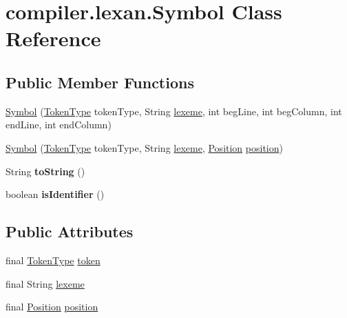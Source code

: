 \hypertarget{classcompiler_1_1lexan_1_1_symbol}{}\section{compiler.\+lexan.\+Symbol Class Reference}
\label{classcompiler_1_1lexan_1_1_symbol}
\subsection*{Public Member Functions}
\begin{DoxyCompactItemize}
\item 
\hyperlink{classcompiler_1_1lexan_1_1_symbol_ae18e45c383fef939abe5bf5959565eec}{Symbol} (\hyperlink{enumcompiler_1_1lexan_1_1_token_type}{Token\+Type} token\+Type, String \hyperlink{classcompiler_1_1lexan_1_1_symbol_afe0beb164bc2b2ae92e2794d48c4d442}{lexeme}, int beg\+Line, int beg\+Column, int end\+Line, int end\+Column)
\item 
\hyperlink{classcompiler_1_1lexan_1_1_symbol_a33e38730798ccfd2bed7d162200e0c47}{Symbol} (\hyperlink{enumcompiler_1_1lexan_1_1_token_type}{Token\+Type} token\+Type, String \hyperlink{classcompiler_1_1lexan_1_1_symbol_afe0beb164bc2b2ae92e2794d48c4d442}{lexeme}, \hyperlink{classcompiler_1_1_position}{Position} \hyperlink{classcompiler_1_1lexan_1_1_symbol_ad89b57b2a1e2ff724cf0e15659f5539a}{position})
\item 
\mbox{\label{classcompiler_1_1lexan_1_1_symbol_a69feb822d58d6c5bc67bf288c1d19304}} 
String {\bfseries to\+String} ()
\item 
\mbox{\label{classcompiler_1_1lexan_1_1_symbol_a9781d5fd33d924e3d9bdf83b8d542a5f}} 
boolean {\bfseries is\+Identifier} ()
\end{DoxyCompactItemize}
\subsection*{Public Attributes}
\begin{DoxyCompactItemize}
\item 
final \hyperlink{enumcompiler_1_1lexan_1_1_token_type}{Token\+Type} \hyperlink{classcompiler_1_1lexan_1_1_symbol_a587ed95f776d43eb968a46f3eb128e1e}{token}
\item 
final String \hyperlink{classcompiler_1_1lexan_1_1_symbol_afe0beb164bc2b2ae92e2794d48c4d442}{lexeme}
\item 
final \hyperlink{classcompiler_1_1_position}{Position} \hyperlink{classcompiler_1_1lexan_1_1_symbol_ad89b57b2a1e2ff724cf0e15659f5539a}{position}
\end{DoxyCompactItemize}


